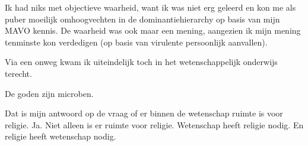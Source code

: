 \documentclass[12pt,a4paper]{article}
\begin{document}
Ik had niks met objectieve waarheid, want ik was niet erg geleerd en kon me als puber moeilijk omhoogvechten in de dominantiehierarchy op basis van mijn MAVO kennis. De waarheid was ook maar een mening, aangezien ik mijn mening tenminste kon verdedigen (op basis van virulente persoonlijk aanvallen).


Via een onweg kwam ik uiteindelijk toch in het wetenschappelijk onderwijs terecht.

De goden zijn microben.

Dat is mijn antwoord op de vraag of er binnen de wetenschap ruimte is voor religie. Ja. Niet alleen is er ruimte voor religie. Wetenschap heeft religie nodig. En religie heeft wetenschap nodig.
\end{document}
